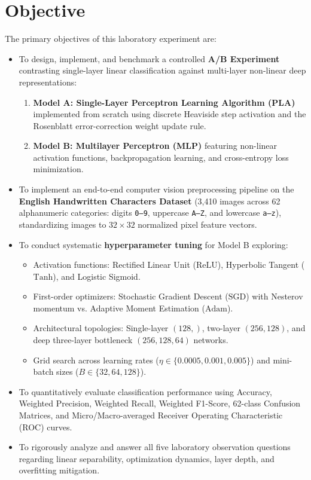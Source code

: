 \documentclass[12pt,a4paper]{article}
\begin{document}
\section{Objective}
The primary objectives of this laboratory experiment are:
\begin{itemize}[noitemsep]
    \item To design, implement, and benchmark a controlled \textbf{A/B Experiment} contrasting single-layer linear classification against multi-layer non-linear deep representations:
    \begin{enumerate}[label=(\alph*),noitemsep]
        \item \textbf{Model A: Single-Layer Perceptron Learning Algorithm (PLA)} implemented from scratch using discrete Heaviside step activation and the Rosenblatt error-correction weight update rule.
        \item \textbf{Model B: Multilayer Perceptron (MLP)} featuring non-linear activation functions, backpropagation learning, and cross-entropy loss minimization.
    \end{enumerate}
    \item To implement an end-to-end computer vision preprocessing pipeline on the \textbf{English Handwritten Characters Dataset} (3,410 images across 62 alphanumeric categories: digits \texttt{0--9}, uppercase \texttt{A--Z}, and lowercase \texttt{a--z}), standardizing images to $32 \times 32$ normalized pixel feature vectors.
    \item To conduct systematic \textbf{hyperparameter tuning} for Model B exploring:
    \begin{itemize}[noitemsep]
        \item Activation functions: Rectified Linear Unit ($\text{ReLU}$), Hyperbolic Tangent ($\text{Tanh}$), and Logistic Sigmoid.
        \item First-order optimizers: Stochastic Gradient Descent ($\text{SGD}$) with Nesterov momentum vs. Adaptive Moment Estimation ($\text{Adam}$).
        \item Architectural topologies: Single-layer $(128,)$, two-layer $(256, 128)$, and deep three-layer bottleneck $(256, 128, 64)$ networks.
        \item Grid search across learning rates ($\eta \in \{0.0005, 0.001, 0.005\}$) and mini-batch sizes ($B \in \{32, 64, 128\}$).
    \end{itemize}
    \item To quantitatively evaluate classification performance using Accuracy, Weighted Precision, Weighted Recall, Weighted F1-Score, 62-class Confusion Matrices, and Micro/Macro-averaged Receiver Operating Characteristic (ROC) curves.
    \item To rigorously analyze and answer all five laboratory observation questions regarding linear separability, optimization dynamics, layer depth, and overfitting mitigation.
\end{itemize}
\end{document}
